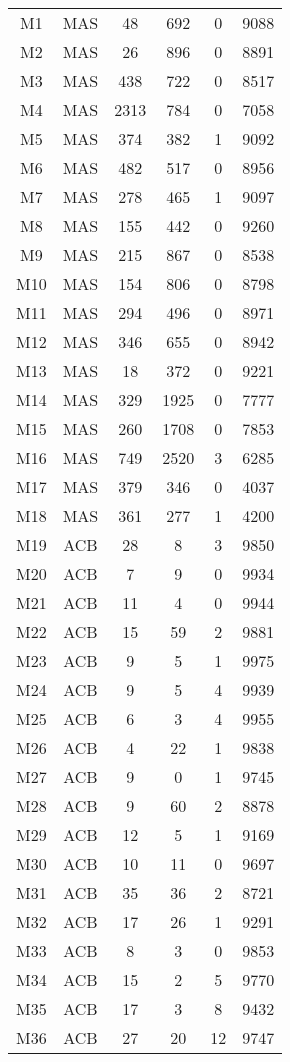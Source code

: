 \begin{center}
\begin{longtable}{cccccc}
\hline \hline
\endlastfoot	
M1	&	MAS	&	48	&	692	&	0	&	9088	\\
M2	&	MAS	&	26	&	896	&	0	&	8891	\\
M3	&	MAS	&	438	&	722	&	0	&	8517	\\
M4	&	MAS	&	2313	&	784	&	0	&	7058	\\
M5	&	MAS	&	374	&	382	&	1	&	9092	\\
M6	&	MAS	&	482	&	517	&	0	&	8956	\\
M7	&	MAS	&	278	&	465	&	1	&	9097	\\
M8	&	MAS	&	155	&	442	&	0	&	9260	\\
M9	&	MAS	&	215	&	867	&	0	&	8538	\\
M10	&	MAS	&	154	&	806	&	0	&	8798	\\
M11	&	MAS	&	294	&	496	&	0	&	8971	\\
M12	&	MAS	&	346	&	655	&	0	&	8942	\\
M13	&	MAS	&	18	&	372	&	0	&	9221	\\
M14	&	MAS	&	329	&	1925	&	0	&	7777	\\
M15	&	MAS	&	260	&	1708	&	0	&	7853	\\
M16	&	MAS	&	749	&	2520	&	3	&	6285	\\
M17	&	MAS	&	379	&	346	&	0	&	4037	\\
M18	&	MAS	&	361	&	277	&	1	&	4200	\\
M19	&	ACB	&	28	&	8	&	3	&	9850	\\
M20	&	ACB	&	7	&	9	&	0	&	9934	\\
M21	&	ACB	&	11	&	4	&	0	&	9944	\\
M22	&	ACB	&	15	&	59	&	2	&	9881	\\
M23	&	ACB	&	9	&	5	&	1	&	9975	\\
M24	&	ACB	&	9	&	5	&	4	&	9939	\\
M25	&	ACB	&	6	&	3	&	4	&	9955	\\
M26	&	ACB	&	4	&	22	&	1	&	9838	\\
M27	&	ACB	&	9	&	0	&	1	&	9745	\\
M28	&	ACB	&	9	&	60	&	2	&	8878	\\
M29	&	ACB	&	12	&	5	&	1	&	9169	\\
M30	&	ACB	&	10	&	11	&	0	&	9697	\\
M31	&	ACB	&	35	&	36	&	2	&	8721	\\
M32	&	ACB	&	17	&	26	&	1	&	9291	\\
M33	&	ACB	&	8	&	3	&	0	&	9853	\\
M34	&	ACB	&	15	&	2	&	5	&	9770	\\
M35	&	ACB	&	17	&	3	&	8	&	9432	\\
M36	&	ACB	&	27	&	20	&	12	&	9747	\\
\end{longtable}    
\end{center}







